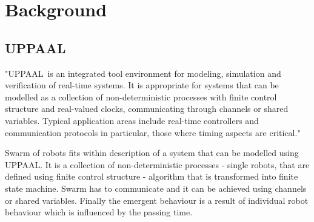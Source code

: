 \section{Background}
\subsection{UPPAAL}
"UPPAAL is an integrated tool environment for modeling, simulation and verification of real-time systems. It is appropriate for systems that can be modelled as a collection of non-deterministic processes with finite control structure and real-valued clocks, communicating through channels or shared variables. Typical application areas include real-time controllers and communication protocols in particular, those where timing aspects are critical." \cite{UPPAAL_in_a_Nutshell}

Swarm of robots fits within description of a system that can be modelled using UPPAAL. It is a collection of non-deterministic processes - single robots, that are defined using finite control structure - algorithm that is transformed into finite state machine. Swarm has to communicate and it can be achieved using channels or shared variables. Finally the emergent behaviour is a result of individual robot behaviour which is influenced by the passing time.
